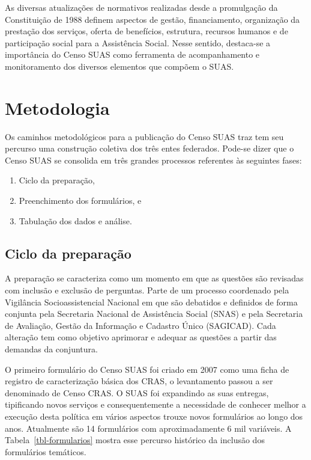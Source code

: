 \documentclass[
  letterpaper,
  DIV=11,
  numbers=noendperiod]{scrreprt}
\providecommand{\tightlist}{%
  \setlength{\itemsep}{0pt}\setlength{\parskip}{0pt}}\usepackage{longtable,booktabs,array}
\begin{document}
As diversas atualizações de normativos realizadas desde a promulgação da
Constituição de 1988 definem aspectos de gestão, financiamento,
organização da prestação dos serviços, oferta de benefícios, estrutura,
recursos humanos e de participação social para a Assistência Social.
Nesse sentido, destaca-se a importância do Censo SUAS como ferramenta de
acompanhamento e monitoramento dos diversos elementos que compõem o
SUAS.


\chapter{Metodologia}\label{metodologia}

Os caminhos metodológicos para a publicação do Censo SUAS traz tem seu
percurso uma construção coletiva dos três entes federados. Pode-se dizer
que o Censo SUAS se consolida em três grandes processos referentes às
seguintes fases:

\begin{enumerate}
\def\labelenumi{\alph{enumi})}
\tightlist
\item
  Ciclo da preparação,
\item
  Preenchimento dos formulários, e
\item
  Tabulação dos dados e análise.
\end{enumerate}

\section{Ciclo da preparação}\label{ciclo-da-preparauxe7uxe3o}

A preparação se caracteriza como um momento em que as questões são
revisadas com inclusão e exclusão de perguntas. Parte de um processo
coordenado pela Vigilância Socioassistencial Nacional em que são
debatidos e definidos de forma conjunta pela Secretaria Nacional de
Assistência Social (SNAS) e pela Secretaria de Avaliação, Gestão da
Informação e Cadastro Único (SAGICAD). Cada alteração tem como objetivo
aprimorar e adequar as questões a partir das demandas da conjuntura.

O primeiro formulário do Censo SUAS foi criado em 2007 como uma ficha de
registro de caracterização básica dos CRAS, o levantamento passou a ser
denominado de Censo CRAS. O SUAS foi expandindo as suas entregas,
tipificando novos serviços e consequentemente a necessidade de conhecer
melhor a execução desta política em vários aspectos trouxe novos
formulários ao longo dos anos. Atualmente são 14 formulários com
aproximadamente 6 mil variáveis. A Tabela~\ref{tbl-formularios} mostra
esse percurso histórico da inclusão dos formulários temáticos.
\end{document}
